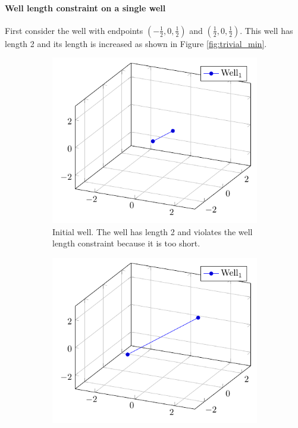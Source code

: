 \paragraph{Well length constraint on a single well}
%
First consider the well with endpoints $(-\frac{1}{2},0,\frac{1}{2})$
and $(\frac{1}{2},0,\frac{1}{2})$. This well has length 2 and its length
is increased as shown in Figure \ref{fig:trivial_min}.
%
\begin{figure}[H]
	\centering
	\begin{subfigure}{0.44\textwidth}
		\centering
		\includegraphics[width=1\textwidth]{figures/trivial_projections/trivial_initial.pdf}
		\caption{Initial well. The well has length 2 and violates the well length constraint
				  because it is too short.}
		\label{fig:trivial_min_a}
	\end{subfigure}\hfill
	\hspace{.05\linewidth}
	\begin{subfigure}{0.44\textwidth}
		\centering
		\includegraphics[width=1\textwidth]{figures/trivial_projections/trivial_min.pdf}

\end{subfigure}
\end{figure}

